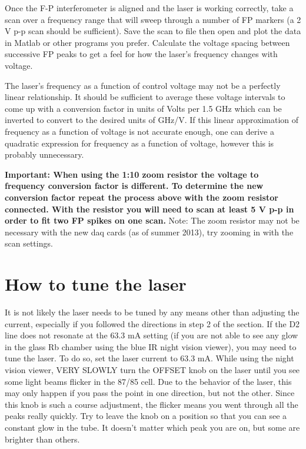 \documentclass{../lab}
\begin{document}
Once the F-P interferometer is aligned and the laser is working correctly, take a scan over a frequency range that will sweep through a number of FP markers (a 2 V p-p scan should be sufficient). Save the scan to file then open and plot the data in Matlab or other programs you prefer. Calculate the voltage spacing between successive FP peaks to get a feel for how the laser's frequency changes with voltage.

The laser's frequency as a function of control voltage may not be a perfectly linear relationship. It should be sufficient to average these voltage intervals to come up with a conversion factor in units of Volts per 1.5 GHz which can be inverted to convert to the desired units of GHz/V. If this linear approximation of frequency as a function of voltage is not accurate enough, one can derive a quadratic expression for frequency as a function of voltage, however this is probably unnecessary.

\textbf{Important: When using the 1:10 zoom resistor the voltage to frequency conversion factor is different. To determine the new conversion factor repeat the process above with the zoom resistor connected. With the resistor you will need to scan at least 5 V p-p in order to fit two FP spikes on one scan.} Note: The zoom resistor may not be necessary with the new daq cards (as of summer 2013), try zooming in with the scan settings.

\section{How to tune the laser}

It is not likely the laser needs to be tuned by any means other than adjusting the current, especially if you followed the directions in step 2 of the  section. If the D2 line does not resonate at the 63.3 mA setting (if you are not able to see any glow in the glass Rb chamber using the blue IR night vision viewer), you may need to tune the laser. To do so, set the laser current to 63.3 mA. While using the night vision viewer, VERY SLOWLY turn the OFFSET knob on the laser until you see some light beams flicker in the 87/85 cell. Due to the behavior of the laser, this may only happen if you pass the point in one direction, but not the other. Since this knob is such a course adjustment, the flicker means you went through all the peaks really quickly. Try to leave the knob on a position so that you can see a constant glow in the tube. It doesn't matter which peak you are on, but some are brighter than others.
\end{document}
